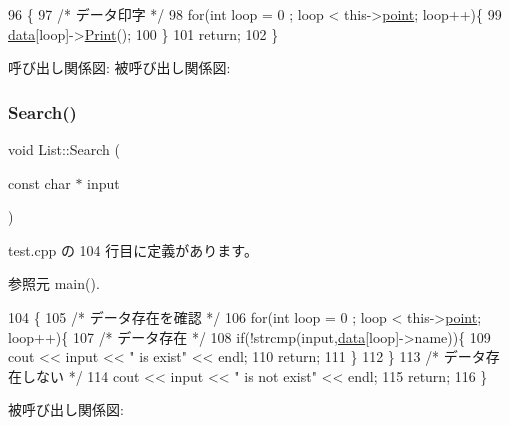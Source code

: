 \begin{DoxyCode}
96                 \{
97         \textcolor{comment}{/* データ印字 */}
98         \textcolor{keywordflow}{for}(\textcolor{keywordtype}{int} loop = 0 ; loop < this->\hyperlink{class_list_ab03801c8c3765b381b45a306d34f5daa}{point}; loop++)\{
99             \hyperlink{class_list_a0fd821411e5922f1733b2afe207f6b28}{data}[loop]->\hyperlink{class_list_item_a0bb35843489312a6796d6f94f4395399}{Print}();
100         \}
101         \textcolor{keywordflow}{return};
102     \}
\end{DoxyCode}
呼び出し関係図\+:
被呼び出し関係図\+:
\mbox{\label{class_list_a518ec1c2a0f0331d4f5fd5733e197d0c}} 
\subsubsection{\texorpdfstring{Search()}{Search()}}
{\footnotesize\ttfamily void List\+::\+Search (\begin{DoxyParamCaption}\item[{const char $\ast$}]{input }\end{DoxyParamCaption})\hspace{0.3cm}{\ttfamily [inline]}}



 test.\+cpp の 104 行目に定義があります。



参照元 main().


\begin{DoxyCode}
104                                   \{
105         \textcolor{comment}{/* データ存在を確認 */}
106         \textcolor{keywordflow}{for}(\textcolor{keywordtype}{int} loop = 0 ; loop < this->\hyperlink{class_list_ab03801c8c3765b381b45a306d34f5daa}{point}; loop++)\{
107             \textcolor{comment}{/* データ存在 */}
108             \textcolor{keywordflow}{if}(!strcmp(input,\hyperlink{class_list_a0fd821411e5922f1733b2afe207f6b28}{data}[loop]->name))\{
109                 cout << input << \textcolor{stringliteral}{" is exist"} << endl;
110                 \textcolor{keywordflow}{return};
111             \}
112         \}
113         \textcolor{comment}{/* データ存在しない */}
114         cout << input << \textcolor{stringliteral}{" is not exist"} << endl;
115         \textcolor{keywordflow}{return};
116     \}
\end{DoxyCode}
被呼び出し関係図\+:
\mbox{\label{class_list_ac59284ff8d930a99616e9a13d49f92b4}} 
